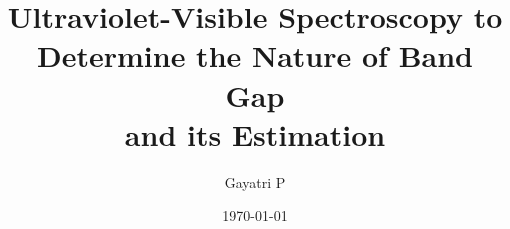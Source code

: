 \documentclass[reprint,amsmath,amssymb,aps, margin=1in]{revtex4-2}
\begin{document}
    \title{Ultraviolet-Visible Spectroscopy to Determine the Nature of Band Gap\\and its Estimation}

    \author{Gayatri P}
    \date{\today}

    
    \maketitle

    
    
    

    
    \nocite{*}
\end{document}
